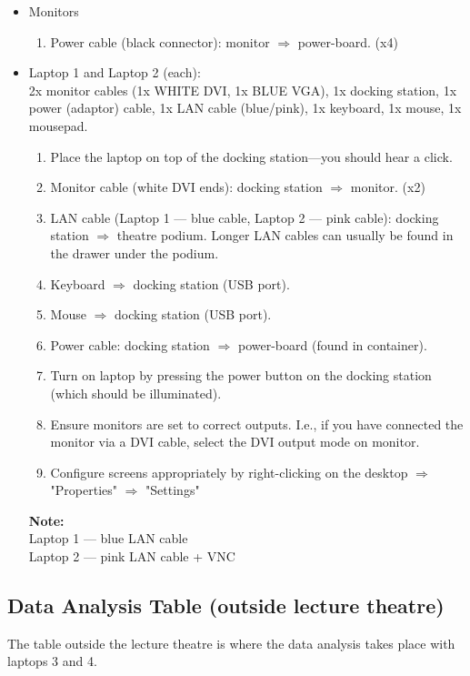 \documentclass{article}
\begin{document}
\begin{itemize}

\item Monitors
\begin{enumerate}
\item Power cable (black connector): monitor $\Rightarrow$ power-board. (x4)
\end{enumerate}

\item Laptop 1 and Laptop 2 (each): \\
2x monitor cables (1x WHITE DVI, 1x BLUE VGA), 1x docking station, 1x power (adaptor) cable, 1x LAN cable (blue/pink), 1x keyboard, 1x mouse, 1x mousepad.
\begin{enumerate}
\item Place the laptop on top of the docking station---you should hear a click.
\item Monitor cable (white DVI ends): docking station $\Rightarrow$ monitor. (x2)
\item LAN cable (Laptop 1 --- blue cable, Laptop 2 --- pink cable): docking station $\Rightarrow$ theatre podium. Longer LAN cables can usually be found in the drawer under the podium.
\item Keyboard $\Rightarrow$ docking station (USB port).
\item Mouse $\Rightarrow$ docking station (USB port).
\item Power cable: docking station $\Rightarrow$ power-board (found in container).
\item Turn on laptop by pressing the power button on the docking station (which should be illuminated).
\item Ensure monitors are set to correct outputs. I.e., if you have connected the monitor via a DVI cable, select the DVI output mode on monitor.
\item Configure screens appropriately by right-clicking on the desktop $\Rightarrow$ "Properties" $\Rightarrow$  "Settings"
\end{enumerate}

\textbf{Note:} \\
Laptop 1 --- blue LAN cable \\
Laptop 2 --- pink LAN cable + VNC

\end{itemize}

\subsection{Data Analysis Table (outside lecture theatre)}
The table outside the lecture theatre is where the data analysis takes place with laptops 3 and 4.
\end{document}
